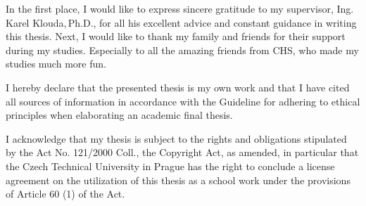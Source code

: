 \documentclass[english,bachelor,unicode]{ctufit-thesis}
\theoremstyle{plain}
\theoremstyle{definition}
\theoremstyle{remark}
\numberwithin{theorem}{chapter}
\begin{document}
 
\frontmatter\frontmatterinit %


\thispagestyle{empty}\cleardoublepage\maketitle %

\imprintpage %

\tableofcontents %
\listoffigures %
\begingroup
\let\clearpage\relax
\listoftables %
\endgroup

\begin{acknowledgmentpage}
    In the first place, I would like to express sincere gratitude to my supervisor, Ing.\,Karel Klouda,\,Ph.D., for all his excellent advice and constant guidance in writing this thesis. Next, I would like to thank my family and friends for their support during my studies. Especially to all the amazing friends from CHS, who made my studies much more fun.
\end{acknowledgmentpage} 


\begin{declarationpage}
I hereby declare that the presented thesis is my own work and that I have cited all
sources of information in accordance with the Guideline for adhering to ethical
principles when elaborating an academic final thesis.

I acknowledge that my thesis is subject to the rights and obligations stipulated by the
Act No. 121/2000 Coll., the Copyright Act, as amended, in particular that the Czech
Technical University in Prague has the right to conclude a license agreement on the
utilization of this thesis as a school work under the provisions of Article 60 (1) of the Act.
\end{declarationpage}
\end{document}
